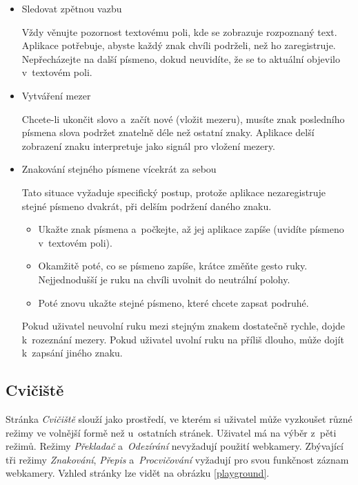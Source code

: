 \documentclass[
  master,
  program=ainfvs,
  biblatex,
  figures=true,
  tables=false,
  sourcecodes=true,
  glossaries,
  index
]{kidiplom}
\begin{document}
            \begin{itemize}
                \item Sledovat zpětnou vazbu \par
                    Vždy věnujte pozornost textovému poli, kde se zobrazuje rozpoznaný text. Aplikace potřebuje, abyste každý znak chvíli podrželi, než ho zaregistruje. Nepřecházejte na další písmeno, dokud neuvidíte, že se to aktuální objevilo v~textovém poli.
                
                \item Vytváření mezer \par
                Chcete-li ukončit slovo a~začít nové (vložit mezeru), musíte znak posledního písmena slova podržet znatelně déle než ostatní znaky. Aplikace delší zobrazení znaku interpretuje jako signál pro vložení mezery.
                
                \item Znakování stejného písmene vícekrát za sebou \par
                    Tato situace vyžaduje specifický postup, protože aplikace nezaregistruje stejné písmeno dvakrát, při delším podržení daného znaku.
                    
                    \begin{itemize}
                        \item Ukažte znak písmena a~počkejte, až jej aplikace zapíše (uvidíte písmeno v~textovém poli).
                        \item Okamžitě poté, co se písmeno zapíše, krátce změňte gesto ruky. Nejjednodušší je ruku na chvíli uvolnit do neutrální polohy.
                        \item Poté znovu ukažte stejné písmeno, které chcete zapsat podruhé.
                    \end{itemize}

                    Pokud uživatel neuvolní ruku mezi stejným znakem dostatečně rychle, dojde k~rozeznání mezery. Pokud uživatel uvolní ruku na příliš dlouho, může dojít k~zapsání jiného znaku.
            \end{itemize}

    
    \subsection{Cvičiště}
        Stránka \emph{Cvičiště} slouží jako prostředí, ve kterém si uživatel může vyzkoušet různé režimy ve volnější formě než u~ostatních stránek. Uživatel má na výběr z~pěti režimů. Režimy \emph{Překladač} a~\emph{Odezírání} nevyžadují použití webkamery. Zbývající tři režimy \emph{Znakování}, \emph{Přepis} a~\emph{Procvičování} vyžadují pro svou funkčnost záznam webkamery. Vzhled stránky lze vidět na obrázku \ref{playground}.
\end{document}
